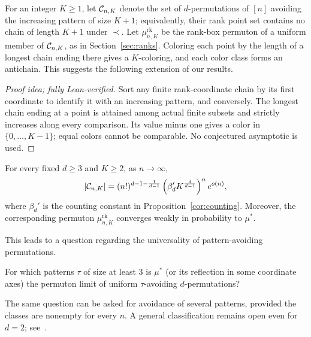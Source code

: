 \documentclass[11pt,letterpaper]{article}
\begin{document}
For an integer $K\ge1$, let $\mathcal C_{n,K}$ denote the set of $d$-permutations of $[n]$ avoiding the increasing pattern of size $K+1$; equivalently, their rank point set contains no chain of length $K+1$ under $\prec$. Let $\mu_{n,K}^{\mathrm{rk}}$ be the rank-box permuton of a uniform member of $\mathcal C_{n,K}$, as in Section~\ref{sec:ranks}. Coloring each point by the length of a longest chain ending there gives a $K$-coloring, and each color class forms an antichain. This suggests the following extension of our results.

\begin{proof}[Proof idea; fully Lean-verified]
Sort any finite rank-coordinate chain by its first coordinate to identify it with an increasing pattern, and conversely. The longest chain ending at a point is attained among actual finite subsets and strictly increases along every comparison. Its value minus one gives a color in $\{0,\ldots,K-1\}$; equal colors cannot be comparable. No conjectured asymptotic is used.
\end{proof}

\begin{conjecture}\label{conj:bounded-chains} For every fixed $d\ge3$ and $K\ge2$, as $n\to\infty$,
      \begin{equation}\label{eq:bounded-chains-counting}
            |\mathcal C_{n,K}|=(n!)^{d-1-\frac1{d-1}}
            \left(\beta_d' K^{\frac d{d-1}}\right)^n e^{o(n)},
      \end{equation}
      where $\beta_d'$ is the counting constant in Proposition~\ref{cor:counting}. Moreover, the corresponding permuton $\mu_{n,K}^{\mathrm{rk}}$ converges weakly in probability to $\mu^\ast$.
\end{conjecture}

This leads to a question regarding the universality of pattern-avoiding permutations.

\begin{question}\label{ques:universality} For which patterns $\tau$ of size at least $3$ is $\mu^\ast$ (or its reflection in some coordinate axes) the permuton limit of uniform $\tau$-avoiding $d$-permutations?
\end{question}
The same question can be asked for avoidance of several patterns, provided the classes are nonempty for every $n$. A general classification remains open even for $d=2$; see~\cite{hohmeier2025permuton}.
\end{document}
